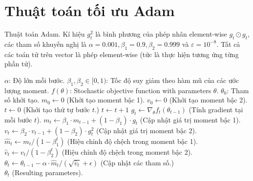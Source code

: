 \documentclass[11pt,oneside,a4paper]{report}
\theoremstyle{definition}
\begin{document}
\chapter{Thuật toán tối ưu Adam}
\begin{algorithm}[!h]
	\caption{Thuật toán Adam. Kí hiệu $g_t^2$ là bình phương của phép nhân element-wise $g_t\odot g_t$, các tham số khuyến nghị là $\alpha = 0.001, \beta_1 = 0.9, \beta_2 = 0.999$ và $\varepsilon = 10^{-8}$. Tất cả các toán tử trên vector là phép element-wise (tức là thực hiện tương ứng từng phần tử).} 
	\begin{algorithmic}
		\Require $\alpha$: Độ lớn mỗi bước.
		\Require $\beta_1, \beta_2 \in [0,1)$: Tốc độ suy giảm theo hàm mũ của các ước lượng moment.
		\Require $f(\theta)$: Stochastic objective function with parameters $\theta$.
		\Require $\theta_0$: Tham số khởi tạo.
		\State $m_0 \leftarrow 0$  (Khởi tạo moment bậc 1).
		\State $v_0 \leftarrow 0$ (Khởi tạo moment bậc 2).
		\State $t \leftarrow 0$ (Khởi tạo thứ tự bước $t$.)
		\State $t \leftarrow t+1$
		\State $g_t \leftarrow \nabla_\theta f_t\left(\theta_{t-1}\right)$ (Tính gradient tại mỗi bước $t$). 
		\State $m_t \leftarrow \beta_1 \cdot m_{t-1}+\left(1-\beta_1\right) \cdot g_t$ (Cập nhật giá trị moment bậc 1). 
		\State $v_t \leftarrow \beta_2 \cdot v_{t-1}+\left(1-\beta_2\right) \cdot g_t^2$ (Cập nhật giá trị moment bậc 2). 
		\State $\widehat{m}_t \leftarrow m_t /\left(1-\beta_1^t\right)$ (Hiệu chỉnh độ chệch trong moment bậc 1).
		\State $\widehat{v}_t \leftarrow v_t /\left(1-\beta_2^t\right)$ (Hiệu chỉnh độ chệch trong moment bậc 2).
		\State $\theta_t \leftarrow \theta_{t-1}-\alpha \cdot \widehat{m}_t /\left(\sqrt{\widehat{v}_t}+\epsilon\right)$ (Cập nhật các tham số.)
		\EndWhile\\
		\Return $\theta_t$ (Resulting parameters).
	\end{algorithmic}
\end{algorithm}
\end{document}
